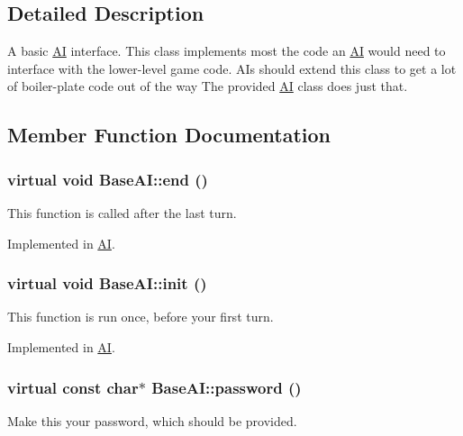 \subsection{Detailed Description}
A basic \hyperlink{classAI}{AI} interface. This class implements most the code an \hyperlink{classAI}{AI} would need to interface with the lower-\/level game code. AIs should extend this class to get a lot of boiler-\/plate code out of the way The provided \hyperlink{classAI}{AI} class does just that. 

\subsection{Member Function Documentation}
\hypertarget{classBaseAI_a60c8246a859ba2dba84b70239bc129bc}{
\subsubsection[{end}]{\setlength{\rightskip}{0pt plus 5cm}virtual void BaseAI::end ()}}
\label{classBaseAI_a60c8246a859ba2dba84b70239bc129bc}
This function is called after the last turn. 

Implemented in \hyperlink{classAI_a67b00a8dd5c6d73db2e4e2332826462e}{AI}.

\hypertarget{classBaseAI_a90ce8becd6f2e32c2cc32d41145e88df}{
\subsubsection[{init}]{\setlength{\rightskip}{0pt plus 5cm}virtual void BaseAI::init ()}}
\label{classBaseAI_a90ce8becd6f2e32c2cc32d41145e88df}
This function is run once, before your first turn. 

Implemented in \hyperlink{classAI_a8c8e3a635791abaa61585357e6a25f63}{AI}.

\hypertarget{classBaseAI_a9251e20447917cda64ad1487b903456f}{
\subsubsection[{password}]{\setlength{\rightskip}{0pt plus 5cm}virtual const char$\ast$ BaseAI::password ()}}
\label{classBaseAI_a9251e20447917cda64ad1487b903456f}
Make this your password, which should be provided. 

